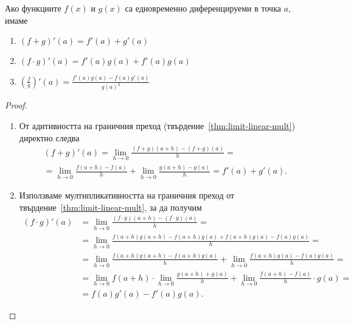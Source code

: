 \documentclass[numbers=endperiod, DIV=15, bibliography=totocnumbered]{scrartcl}
\begin{document}
\begin{theorem}
  Ако функциите $f(x)$ и $g(x)$ са едновременно диференцируеми в точка $a$, имаме
  \begin{enumerate}
    \item $(f+g)'(a) = f'(a) + g'(a)$
    \item $(f \cdot g)'(a) = f'(a) g(a) + f'(a) g(a)$
    \item $(\frac f g)'(a) = \frac{f'(a) g(a) - f(a) g'(a)} {{g(a)}^2}$
  \end{enumerate}
\end{theorem}
\begin{proof}
  \mbox{}
  \begin{enumerate}
    \item От адитивността на граничния преход (твърдение~\ref{thm:limit-linear-mult}) директно следва
    \begin{multline*}
      (f+g)'(a)
      =
      \lim_{h \to 0} \frac {(f+g)(a+h) - (f+g)(a)} h
      = \\ =
      \lim_{h \to 0} \frac {f(a+h)-f(a)} h + \lim_{h \to 0} \frac{g(a+h) - g(a)} h
      =
      f'(a) + g'(a).
    \end{multline*}

    \item Използваме мултипликативността на граничния преход от твърдение~\ref{thm:limit-linear-mult}, за да получим
    \begin{align*}
      (f \cdot g)'(a)
      &=
      \lim_{h \to 0} \frac {(f \cdot g)(a+h) - (f \cdot g)(a)} h
      = \\ &=
      \lim_{h \to 0} \frac {f(a+h) g(a+h) - f(a+h) g(a) + f(a+h) g(a) - f(a) g(a)} h
      = \\ &=
      \lim_{h \to 0} \frac {f(a+h) g(a+h) - f(a+h) g(a)} h + \lim_{h \to 0} \frac {f(a+h) g(a) - f(a) g(a)} h
      = \\ &=
      \lim_{h \to 0} f(a+h) \cdot \lim_{h \to 0} \frac {g(a+h) + g(a)} h + \lim_{h \to 0} \frac {f(a+h) - f(a)} h \cdot g(a)
      = \\ &=
      f(a) g'(a) - f'(a) g(a).
    \end{align*}


\end{enumerate}
\end{proof}
\end{document}
